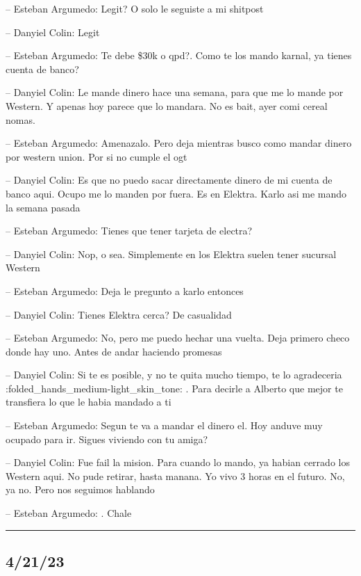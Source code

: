 -- Esteban Argumedo: Legit? O solo le seguiste a mi shitpost

-- Danyiel Colin: Legit

-- Esteban Argumedo: Te debe \$30k o qpd?. Como te los mando karnal, ya
tienes cuenta de banco?

-- Danyiel Colin: Le mande dinero hace una semana, para que me lo mande
por Western. Y apenas hoy parece que lo mandara. No es bait, ayer comi
cereal nomas.

-- Esteban Argumedo: Amenazalo. Pero deja mientras busco como mandar
dinero por western union. Por si no cumple el ogt

-- Danyiel Colin: Es que no puedo sacar directamente dinero de mi cuenta
de banco aqui. Ocupo me lo manden por fuera. Es en Elektra. Karlo asi me
mando la semana pasada

-- Esteban Argumedo: Tienes que tener tarjeta de electra?

-- Danyiel Colin: Nop, o sea. Simplemente en los Elektra suelen tener
sucursal Western

-- Esteban Argumedo: Deja le pregunto a karlo entonces

-- Danyiel Colin: Tienes Elektra cerca? De casualidad

-- Esteban Argumedo: No, pero me puedo hechar una vuelta. Deja primero
checo donde hay uno. Antes de andar haciendo promesas

-- Danyiel Colin: Si te es posible, y no te quita mucho tiempo, te lo
agradeceria :folded\_hands\_medium-light\_skin\_tone: . Para decirle a
Alberto que mejor te transfiera lo que le habia mandado a ti

-- Esteban Argumedo: Segun te va a mandar el dinero el. Hoy anduve muy
ocupado para ir. Sigues viviendo con tu amiga?

-- Danyiel Colin: Fue fail la mision. Para cuando lo mando, ya habian
cerrado los Western aqui. No pude retirar, hasta manana. Yo vivo 3 horas
en el futuro. No, ya no. Pero nos seguimos hablando

-- Esteban Argumedo: . Chale

\begin{center}\rule{0.5\linewidth}{0.5pt}\end{center}

\hypertarget{section-195}{%
\subsection{4/21/23}\label{section-195}}

